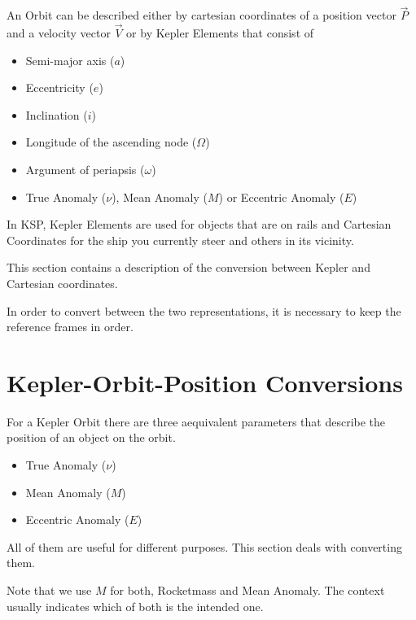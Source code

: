 \documentclass[11pt]{report}
\newcommand{\oa}[1]{\overrightarrow{#1}}
\newcommand{\Pos}{\oa{P}}
\newcommand{\Vel}{\oa{V}}
\begin{document}
An  Orbit can be described either by  cartesian coordinates of a position vector $\Pos$ and a
velocity vector $\Vel$ or by  Kepler Elements
\cite{Kepler} that consist of

\begin{itemize}
\item {} Semi-major axis ($a$)
\item {} Eccentricity ($e$)
\item {} Inclination ($i$)
\item {} Longitude of the ascending node ($\Omega$)
\item {} Argument of periapsis ($\omega$)
\item True Anomaly ($\nu$), Mean Anomaly ($M$) or Eccentric Anomaly ($E$)
\end{itemize}

In KSP, Kepler Elements are used for objects that are on rails and
Cartesian Coordinates for the ship you currently steer and others in
its vicinity.

This section contains a description of the conversion between Kepler
and Cartesian coordinates.

In order to convert between the two representations, it is necessary
to keep the reference frames in order.

\section{Kepler-Orbit-Position
  Conversions} \label{KeplerOrbitPositionConversions}

For a Kepler Orbit there are three aequivalent parameters that
describe the position of an object on the orbit.

\begin{itemize}
\item {} True Anomaly ($\nu$) \cite{TrueA}
\item {} Mean Anomaly ($M$) \cite{MeanA}
\item {} Eccentric Anomaly ($E$)
  \cite{EccentricA}
\end{itemize}

All of them are useful for different purposes. This section deals with
converting them.

Note that we use $M$ for both, Rocketmass and Mean Anomaly. The
context usually indicates which of both is the intended one.
\end{document}
